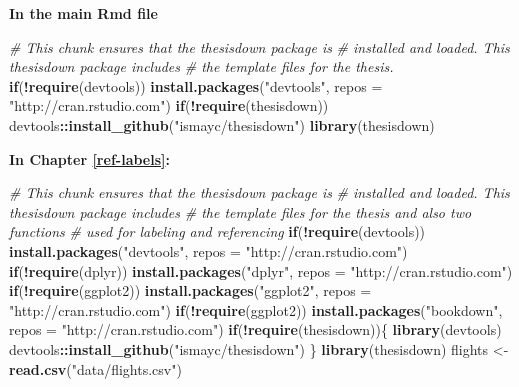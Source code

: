 \documentclass[12pt,twoside]{reedthesis}
\newenvironment{Shaded}{\begin{snugshade}}{\end{snugshade}}
\newcommand{\AttributeTok}[1]{\textcolor[rgb]{0.13,0.29,0.53}{#1}}
\newcommand{\CommentTok}[1]{\textcolor[rgb]{0.56,0.35,0.01}{\textit{#1}}}
\newcommand{\ControlFlowTok}[1]{\textcolor[rgb]{0.13,0.29,0.53}{\textbf{#1}}}
\newcommand{\FunctionTok}[1]{\textcolor[rgb]{0.13,0.29,0.53}{\textbf{#1}}}
\newcommand{\NormalTok}[1]{#1}
\newcommand{\OtherTok}[1]{\textcolor[rgb]{0.56,0.35,0.01}{#1}}
\newcommand{\SpecialCharTok}[1]{\textcolor[rgb]{0.81,0.36,0.00}{\textbf{#1}}}
\newcommand{\StringTok}[1]{\textcolor[rgb]{0.31,0.60,0.02}{#1}}
\begin{document}
\textbf{In the main Rmd file}
\begin{Shaded}
\begin{Highlighting}[]
\CommentTok{\# This chunk ensures that the thesisdown package is}
\CommentTok{\# installed and loaded. This thesisdown package includes}
\CommentTok{\# the template files for the thesis.}
\ControlFlowTok{if}\NormalTok{(}\SpecialCharTok{!}\FunctionTok{require}\NormalTok{(devtools))}
  \FunctionTok{install.packages}\NormalTok{(}\StringTok{"devtools"}\NormalTok{, }\AttributeTok{repos =} \StringTok{"http://cran.rstudio.com"}\NormalTok{)}
\ControlFlowTok{if}\NormalTok{(}\SpecialCharTok{!}\FunctionTok{require}\NormalTok{(thesisdown))}
\NormalTok{  devtools}\SpecialCharTok{::}\FunctionTok{install\_github}\NormalTok{(}\StringTok{"ismayc/thesisdown"}\NormalTok{)}
\FunctionTok{library}\NormalTok{(thesisdown)}
\end{Highlighting}
\end{Shaded}
\textbf{In Chapter \ref{ref-labels}:}
\begin{Shaded}
\begin{Highlighting}[]
\CommentTok{\# This chunk ensures that the thesisdown package is}
\CommentTok{\# installed and loaded. This thesisdown package includes}
\CommentTok{\# the template files for the thesis and also two functions}
\CommentTok{\# used for labeling and referencing}
\ControlFlowTok{if}\NormalTok{(}\SpecialCharTok{!}\FunctionTok{require}\NormalTok{(devtools))}
  \FunctionTok{install.packages}\NormalTok{(}\StringTok{"devtools"}\NormalTok{, }\AttributeTok{repos =} \StringTok{"http://cran.rstudio.com"}\NormalTok{)}
\ControlFlowTok{if}\NormalTok{(}\SpecialCharTok{!}\FunctionTok{require}\NormalTok{(dplyr))}
    \FunctionTok{install.packages}\NormalTok{(}\StringTok{"dplyr"}\NormalTok{, }\AttributeTok{repos =} \StringTok{"http://cran.rstudio.com"}\NormalTok{)}
\ControlFlowTok{if}\NormalTok{(}\SpecialCharTok{!}\FunctionTok{require}\NormalTok{(ggplot2))}
    \FunctionTok{install.packages}\NormalTok{(}\StringTok{"ggplot2"}\NormalTok{, }\AttributeTok{repos =} \StringTok{"http://cran.rstudio.com"}\NormalTok{)}
\ControlFlowTok{if}\NormalTok{(}\SpecialCharTok{!}\FunctionTok{require}\NormalTok{(ggplot2))}
    \FunctionTok{install.packages}\NormalTok{(}\StringTok{"bookdown"}\NormalTok{, }\AttributeTok{repos =} \StringTok{"http://cran.rstudio.com"}\NormalTok{)}
\ControlFlowTok{if}\NormalTok{(}\SpecialCharTok{!}\FunctionTok{require}\NormalTok{(thesisdown))\{}
  \FunctionTok{library}\NormalTok{(devtools)}
\NormalTok{  devtools}\SpecialCharTok{::}\FunctionTok{install\_github}\NormalTok{(}\StringTok{"ismayc/thesisdown"}\NormalTok{)}
\NormalTok{  \}}
\FunctionTok{library}\NormalTok{(thesisdown)}
\NormalTok{flights }\OtherTok{\textless{}{-}} \FunctionTok{read.csv}\NormalTok{(}\StringTok{"data/flights.csv"}\NormalTok{)}
\end{Highlighting}
\end{Shaded}
\end{document}

